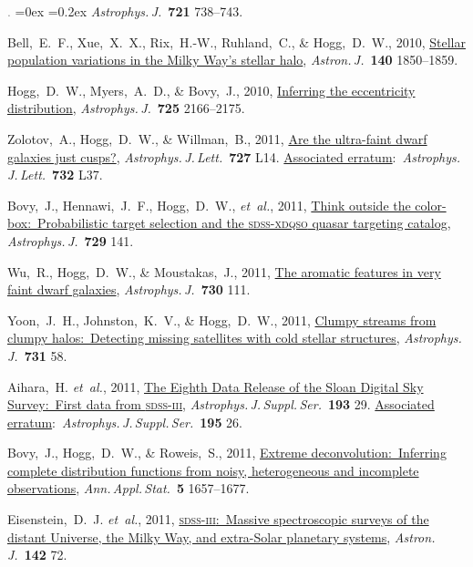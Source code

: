 \documentclass[12pt,letterpaper]{article}
\newcommand{\latin}[1]{\textsl{#1}}
\newcommand{\etal}{\latin{et~al.}}
\newcommand{\doi}[2]{\href{http://dx.doi.org/#1}{{#2}}}
\newcommand{\deemph}[1]{\textcolor{grey}{\footnotesize{#1}}}
\newcommand{\pubnumber}[1]{\deemph{{#1}.}}
\newcounter{refpubnum}
\newcommand{\hogglist}{%
    \rightmargin=0in
    \leftmargin=0.18in
    \topsep=0ex
    \partopsep=0pt
    \itemsep=0.2ex
    \parsep=0pt
    \itemindent=-1.0\leftmargin
    \listparindent=0.0\leftmargin
    \settowidth{\labelsep}{~}
    \usecounter{refpubnum}
  }
\begin{document}
\begin{list}{\pubnumber{\therefpubnum}}{\hogglist}
\textit{Astrophys.\,J.}\ \textbf{721} 738--743.
\item
Bell,~E.~F., Xue,~X.~X., Rix,~H.-W., Ruhland,~C., \& Hogg,~D.~W., 2010,
\doi{10.1088/0004-6256/140/6/1850}{Stellar population variations in the Milky Way's stellar halo},
\textit{Astron.\,J.}\ \textbf{140} 1850--1859.
\item
Hogg,~D.~W., Myers,~A.~D., \& Bovy,~J., 2010,
\doi{10.1088/0004-637X/725/2/2166}{Inferring the eccentricity distribution},
\textit{Astrophys.\,J.}\ \textbf{725} 2166--2175.
\item
Zolotov,~A., Hogg,~D.~W., \& Willman,~B., 2011,
\doi{10.1088/2041-8205/727/1/L14}{Are the ultra-faint dwarf galaxies just cusps?},
\textit{Astrophys.\,J.\,Lett.}\ \textbf{727} L14.
\doi{10.1088/2041-8205/732/2/L37}{Associated erratum}:\ \textit{Astrophys.\,J.\,Lett.}\ \textbf{732} L37.
\item
Bovy,~J., Hennawi,~J.~F., Hogg,~D.~W., \etal, 2011,
\doi{10.1088/0004-637X/729/2/141}{Think outside the color-box:\ Probabilistic target selection and the \textsc{sdss-xdqso} quasar targeting catalog},
\textit{Astrophys.\,J.}\ \textbf{729} 141.
\item
Wu,~R., Hogg,~D.~W., \& Moustakas,~J., 2011,
\doi{10.1088/0004-637X/730/2/111}{The aromatic features in very faint dwarf galaxies},
\textit{Astrophys.\,J.}\ \textbf{730} 111.
\item
Yoon,~J.~H., Johnston,~K.~V., \& Hogg,~D.~W., 2011,
\doi{10.1088/0004-637X/731/1/58}{Clumpy streams from clumpy halos:\ Detecting missing satellites with cold stellar structures}, 
\textit{Astrophys.\,J.}\ \textbf{731} 58.
\item
Aihara,~H. \etal, 2011,
\doi{10.1088/0067-0049/193/2/29}{The Eighth Data Release of the Sloan Digital Sky Survey:\ First data from \textsc{sdss-iii}},
\textit{Astrophys.\,J.\,Suppl.\,Ser.}\ \textbf{193} 29.
\doi{10.1088/0067-0049/195/2/26}{Associated erratum}:\ \textit{Astrophys.\,J.\,Suppl.\,Ser.}\ \textbf{195} 26.
\item
Bovy,~J., Hogg,~D.~W., \& Roweis,~S., 2011,
\doi{10.1214/10-AOAS439}{Extreme deconvolution:\ Inferring complete distribution functions from noisy, heterogeneous and incomplete observations},
\textit{Ann.\,Appl.\,Stat.}\ \textbf{5} 1657--1677.
\item
Eisenstein,~D.~J. \etal, 2011,
\doi{10.1088/0004-6256/142/3/72}{\textsc{sdss-iii}:\ Massive spectroscopic surveys of the distant Universe, the Milky Way, and extra-Solar planetary systems},
\textit{Astron.\,J.}\ \textbf{142} 72.
\item

\end{list}
\end{document}
